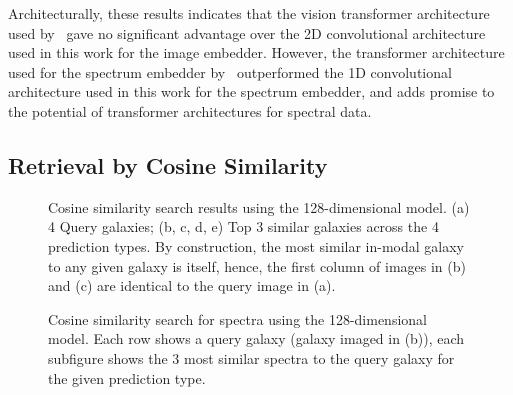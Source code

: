 Architecturally, these results indicates that the vision transformer architecture used by~\cite{astroclip} gave no
significant advantage over the 2D convolutional architecture used in this work for the image embedder.
However, the transformer architecture used for the spectrum embedder by~\cite{astroclip} outperformed the 1D convolutional
architecture used in this work for the spectrum embedder, and adds promise to the potential of transformer architectures
for spectral data.

\subsection{Retrieval by Cosine Similarity}\label{subsec:results-retrieval}
\begin{figure}[t]
    \centering
    \caption{Cosine similarity search results using the 128-dimensional model. (a) 4 Query galaxies;
        (b, c, d, e) Top 3 similar galaxies across the 4 prediction types.
        By construction, the most similar in-modal galaxy to any given galaxy is itself, hence, the first column of images
        in (b) and (c) are identical to the query image in (a).}
    \label{fig:ssia}
\end{figure}

\begin{figure}[t]
    \centering
    \caption{Cosine similarity search for spectra using the 128-dimensional model.
    Each row shows a query galaxy (galaxy imaged in (b)), each subfigure shows the 3 most similar spectra to the query galaxy
       for the given prediction type.}
    \label{fig:sss}
\end{figure}

